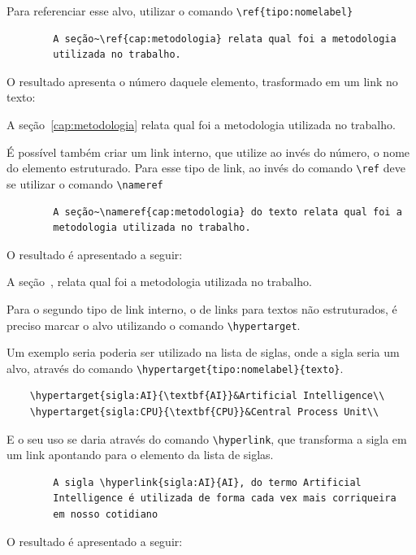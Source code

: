 \begin{enumerate}
	Para referenciar esse alvo, utilizar o comando \verb|\ref{tipo:nomelabel}|

	\begin{verbatim}
		A seção~\ref{cap:metodologia} relata qual foi a metodologia
		utilizada no trabalho.
	\end{verbatim}

	O resultado apresenta o número daquele elemento, trasformado em um link no texto:

	A seção~\ref{cap:metodologia} relata qual foi a metodologia utilizada no trabalho.

	É possível também criar um link interno, que utilize ao invés do número, o nome do elemento estruturado. Para esse tipo de link, ao invés do comando \verb|\ref| deve se utilizar o comando \verb|\nameref|

	\begin{verbatim}
		A seção~\nameref{cap:metodologia} do texto relata qual foi a 
		metodologia utilizada no trabalho.
	\end{verbatim}

	O resultado é apresentado a seguir:

	A seção~, relata qual foi a metodologia utilizada no trabalho.

	Para o segundo tipo de link interno, o de links para textos não estruturados, é preciso marcar o alvo utilizando o comando \verb|\hypertarget|.

	Um exemplo seria poderia ser utilizado na lista de siglas, onde a sigla seria um alvo, através do comando \verb|\hypertarget{tipo:nomelabel}{texto}|.

	\begin{verbatim}
	\hypertarget{sigla:AI}{\textbf{AI}}&Artificial Intelligence\\
	\hypertarget{sigla:CPU}{\textbf{CPU}}&Central Process Unit\\
	\end{verbatim}

	E o seu uso se daria através do comando \verb|\hyperlink|, que transforma a sigla em um link apontando para o elemento da lista de siglas.

	\begin{verbatim}
		A sigla \hyperlink{sigla:AI}{AI}, do termo Artificial
		Intelligence é utilizada de forma cada vex mais corriqueira
		em nosso cotidiano
	\end{verbatim}

	O resultado é apresentado a seguir:


\end{enumerate}
